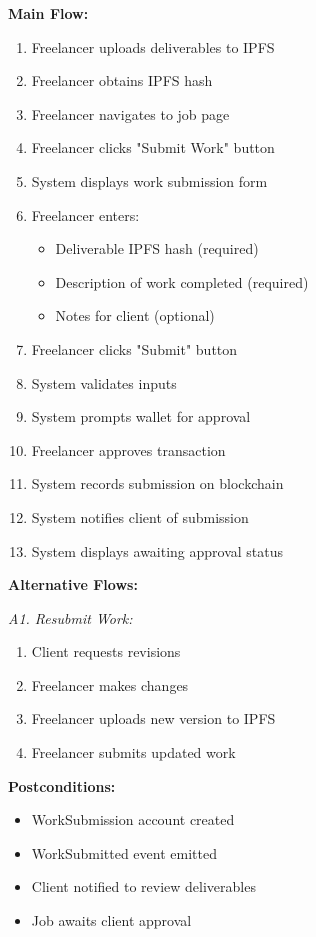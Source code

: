 \documentclass[a4paper,13pt,twoside]{report}
\theoremstyle{definition}
\begin{document}
\textbf{Main Flow:}
\begin{enumerate}
    \item Freelancer uploads deliverables to IPFS
    \item Freelancer obtains IPFS hash
    \item Freelancer navigates to job page
    \item Freelancer clicks "Submit Work" button
    \item System displays work submission form
    \item Freelancer enters:
    \begin{itemize}
        \item Deliverable IPFS hash (required)
        \item Description of work completed (required)
        \item Notes for client (optional)
    \end{itemize}
    \item Freelancer clicks "Submit" button
    \item System validates inputs
    \item System prompts wallet for approval
    \item Freelancer approves transaction
    \item System records submission on blockchain
    \item System notifies client of submission
    \item System displays awaiting approval status
\end{enumerate}

\textbf{Alternative Flows:}

\textit{A1. Resubmit Work:}
\begin{enumerate}
    \item Client requests revisions
    \item Freelancer makes changes
    \item Freelancer uploads new version to IPFS
    \item Freelancer submits updated work
\end{enumerate}

\textbf{Postconditions:}
\begin{itemize}
    \item WorkSubmission account created
    \item WorkSubmitted event emitted
    \item Client notified to review deliverables
    \item Job awaits client approval
\end{itemize}
\end{document}
